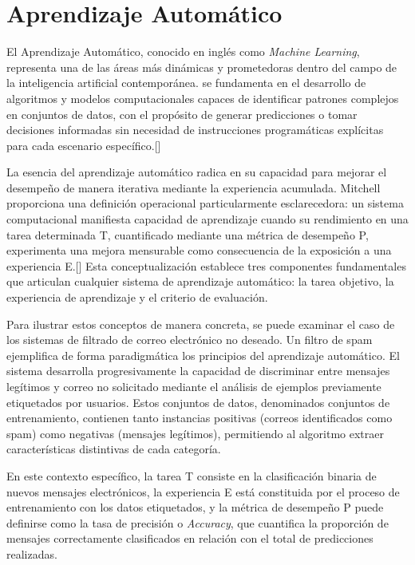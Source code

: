 \chapter{Aprendizaje Automático}
%

El Aprendizaje Automático, conocido en inglés como \textit{Machine Learning}, representa una de las áreas más dinámicas y prometedoras dentro del campo de la inteligencia artificial contemporánea. se fundamenta en el desarrollo de algoritmos y modelos computacionales capaces de identificar patrones complejos en conjuntos de datos, con el propósito de generar predicciones o tomar decisiones informadas sin necesidad de instrucciones programáticas explícitas para cada escenario específico.[]
%

La esencia del aprendizaje automático radica en su capacidad para mejorar el desempeño de manera iterativa mediante la experiencia acumulada. Mitchell proporciona una definición operacional particularmente esclarecedora: un sistema computacional manifiesta capacidad de aprendizaje cuando su rendimiento en una tarea determinada T, cuantificado mediante una métrica de desempeño P, experimenta una mejora mensurable como consecuencia de la exposición a una experiencia E.[] Esta conceptualización establece tres componentes fundamentales que articulan cualquier sistema de aprendizaje automático: la tarea objetivo, la experiencia de aprendizaje y el criterio de evaluación.
%

Para ilustrar estos conceptos de manera concreta, se puede examinar el caso de los sistemas de filtrado de correo electrónico no deseado. Un filtro de spam ejemplifica de forma paradigmática los principios del aprendizaje automático. El sistema desarrolla progresivamente la capacidad de discriminar entre mensajes legítimos y correo no solicitado mediante el análisis de ejemplos previamente etiquetados por usuarios. Estos conjuntos de datos, denominados conjuntos de entrenamiento, contienen tanto instancias positivas (correos identificados como spam) como negativas (mensajes legítimos), permitiendo al algoritmo extraer características distintivas de cada categoría.
%

En este contexto específico, la tarea T consiste en la clasificación binaria de nuevos mensajes electrónicos, la experiencia E está constituida por el proceso de entrenamiento con los datos etiquetados, y la métrica de desempeño P puede definirse como la tasa de precisión o \textit{Accuracy}, que cuantifica la proporción de mensajes correctamente clasificados en relación con el total de predicciones realizadas.
%

